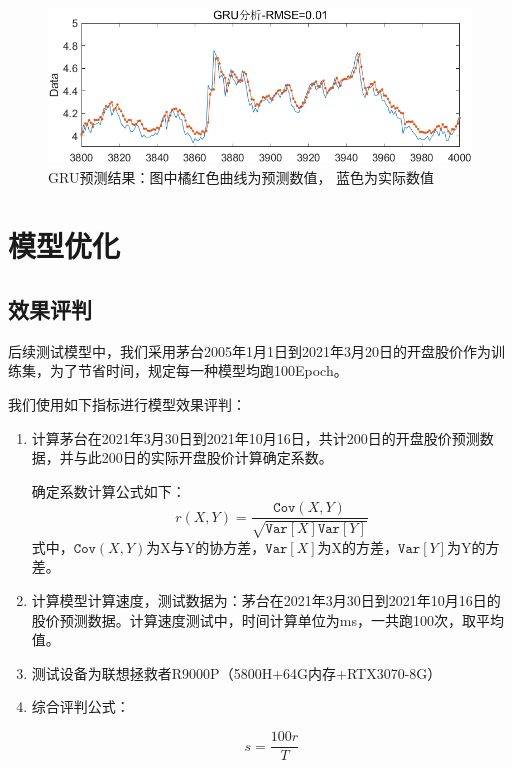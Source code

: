 \documentclass{jnuthesis}
\begin{document}
\begin{figure}[H]
	\centering
	\includegraphics[width=1\linewidth]{pic/screenshot016}
	\caption{GRU预测结果：图中\textcolor[RGB]{217, 83, 25}{橘红色}曲线为预测数值， \textcolor[RGB]{97,167,212}{蓝色}为实际数值}
	\label{fig:screenshot016}
\end{figure}


\section{模型优化}


\subsection{效果评判}
后续测试模型中，我们采用茅台2005年1月1日到2021年3月20日的开盘股价作为训练集，为了节省时间，规定每一种模型均跑100Epoch。

我们使用如下指标进行模型效果评判：

\begin{enumerate}
	\item 计算茅台在2021年3月30日到2021年10月16日，共计200日的开盘股价预测数据，并与此200日的实际开盘股价计算确定系数。
	
	确定系数计算公式如下：
	\begin{equation}\label{r}
		r(X,Y)=\dfrac{\texttt{Cov}(X,Y)}{\sqrt{\texttt{Var}[X]\texttt{Var}[Y]}}
	\end{equation}
	式中，$ \texttt{Cov}(X,Y) $为X与Y的协方差，$ \texttt{Var}[X] $为X的方差，$ \texttt{Var}[Y] $为Y的方差。
	\item 计算模型计算速度，测试数据为：茅台在2021年3月30日到2021年10月16日的股价预测数据。计算速度测试中，时间计算单位为ms，一共跑100次，取平均值。
	\item 测试设备为联想拯救者R9000P（5800H+64G内存+RTX3070-8G）
	
	\item 综合评判公式：
	
	\begin{equation}\label{pingpan}
		s=\dfrac{100r}{T}
	\end{equation}
\end{enumerate}
\end{document}
